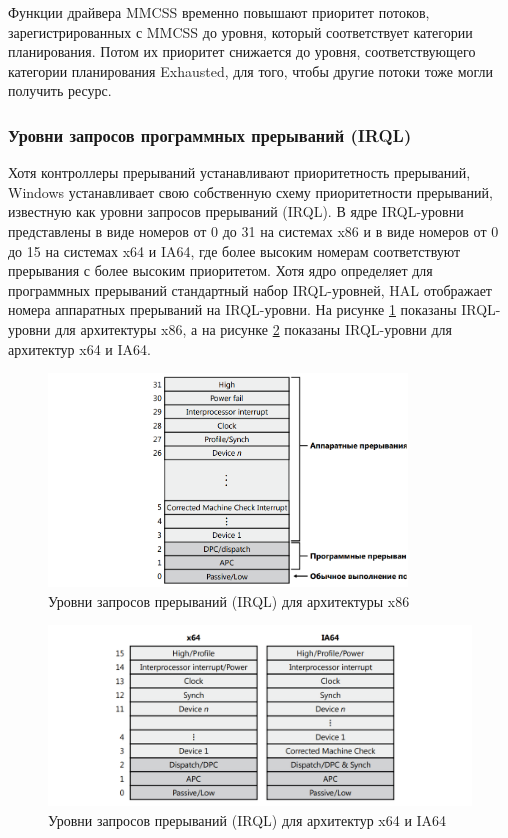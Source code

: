 \documentclass[a4paper,14pt]{extarticle}
\begin{document}
Функции драйвера MMCSS временно повышают приоритет потоков, зарегистрированных с
MMCSS до уровня, который соответствует категории планирования. Потом их приоритет снижается до уровня, соответствующего категории планирования Exhausted, для
того, чтобы другие потоки тоже могли получить ресурс.

\subsubsection{Уровни запросов программных прерываний (IRQL)}

Хотя контроллеры прерываний устанавливают приоритетность прерываний, Windows устанавливает свою собственную схему приоритетности прерываний, известную как уровни запросов прерываний (IRQL). В ядре IRQL-уровни представлены в виде номеров от 0 до 31 на системах x86 и в виде номеров от 0 до 15 на системах x64 и IA64, где более высоким номерам соответствуют прерывания с более высоким приоритетом. Хотя ядро определяет для программных прерываний стандартный набор IRQL-уровней, HAL отображает номера аппаратных прерываний на IRQL-уровни. На рисунке \ref{fig:x86} показаны IRQL-уровни для архитектуры
x86, а на рисунке \ref{fig:x64} показаны IRQL-уровни для архитектур x64 и IA64.

\begin{figure}[h]
	\centering
	\includegraphics[width=0.85\textwidth]{img/1.png}
	\caption{Уровни запросов прерываний (IRQL) для архитектуры x86}
	\label{fig:x86}
\end{figure} 

\begin{figure}[h]
\centering
\includegraphics[width=\textwidth]{img/2.png}
\caption{Уровни запросов прерываний (IRQL) для архитектур x64 и IA64}
\label{fig:x64}
\end{figure} 
\end{document}
